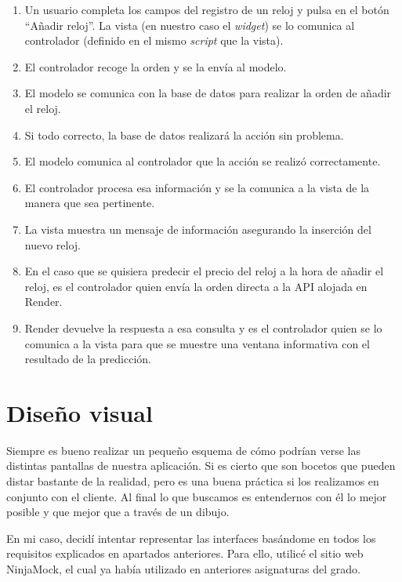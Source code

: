 
	\begin{enumerate}
		\item Un usuario completa los campos del registro de un reloj y pulsa en el botón ``Añadir reloj''. La vista (en nuestro caso el \emph{widget}) se lo comunica al controlador (definido en el mismo \emph{script} que la vista).
		\item El controlador recoge la orden y se la envía al modelo.
		\item El modelo se comunica con la base de datos para realizar la orden de añadir el reloj.
		\item Si todo correcto, la base de datos realizará la acción sin problema.
		\item El modelo comunica al controlador que la acción se realizó correctamente.
		\item El controlador procesa esa información y se la comunica a la vista de la manera que sea pertinente.
		\item La vista muestra un mensaje de información asegurando la inserción del nuevo reloj.
		\item En el caso que se quisiera predecir el precio del reloj a la hora de añadir el reloj, es el controlador quien envía la orden directa a la API alojada en Render.
		\item Render devuelve la respuesta a esa consulta y es el controlador quien se lo comunica a la vista para que se muestre una ventana informativa con el resultado de la predicción.
	\end{enumerate}

\section{Diseño visual}

	Siempre es bueno realizar un pequeño esquema de cómo podrían verse las distintas pantallas de nuestra aplicación. Si es cierto que son bocetos que pueden distar bastante de la realidad, pero es una buena práctica si los realizamos en conjunto con el cliente. Al final lo que buscamos es entendernos con él lo mejor posible y que mejor que a través de un dibujo.
	
	En mi caso, decidí intentar representar las interfaces basándome en todos los requisitos explicados en apartados anteriores. Para ello, utilicé el sitio web NinjaMock, el cual ya había utilizado en anteriores asignaturas del grado.
	
